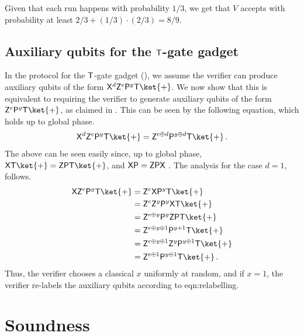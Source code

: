 \documentclass{toc}
\newcommand{\pgate}{{\sf P}}
\newcommand{\rgate}{{\sf T}}
\newcommand{\tgate}{{\sf T}}
\newcommand{\xgate}{{\sf X}}
\newcommand{\zgate}{{\sf Z}}
\begin{document}
Given that each run happens with probability ${1}/{3}$, we get that $V$ accepts with probability at least ${2}/{3} + ({1}/{3}) \cdot ({2}/{3}) = {8}/{9}$.

\subsection{Auxiliary qubits for the \texorpdfstring{$\tgate$}{T}-gate gadget}
\label{section:resources-T-gate}
In the protocol for the $\tgate$-gate gadget (), we assume the verifier can produce auxiliary qubits of the form $\xgate^d\zgate^e\pgate^y\tgate\ket{+}$. We now show that this is equivalent to requiring the verifier to generate auxiliary qubits of the form $\zgate^e \pgate^y \tgate \ket{+}$, as claimed in .
%
%
This can be seen by the following equation, which holds up to global phase. 
\begin{equation}
\label{eqn:relabelling}
\xgate^d\zgate^e \pgate^y \tgate \ket{+} = \zgate^{e  \oplus d} \pgate^{y \oplus d} \tgate \ket{+}\,.
\end{equation}
The above can be seen easily since, up to global phase, $\xgate \rgate \ket{+} = \zgate \pgate \rgate \ket{+} $, and $\xgate \pgate = \zgate \pgate \xgate$%
.
%
%
The analysis for the case $d=1$, follows. 
\begin{align}
\xgate\zgate^e \pgate^y \tgate \ket{+} &= \zgate^e \xgate  \pgate^y \tgate \ket{+}\\
& = \zgate^e \zgate^y \pgate^y \xgate \tgate \ket{+} \\
&= \zgate^{e\oplus y}  \pgate^y \zgate \pgate  \tgate \ket{+} \\
&= \zgate^{e\oplus y \oplus 1}  \pgate^{y +1} \tgate \ket{+}\\
&=  \zgate^{e\oplus y \oplus 1}  \zgate^y \pgate^{y \oplus 1} \tgate \ket{+}\\
&=  \zgate^{e \oplus 1} \pgate^{y \oplus 1} \tgate \ket{+}\,.
\end{align}
Thus, the verifier chooses a classical $x$ uniformly at random, and if $x=1$, the verifier re-labels the auxiliary qubits according to  {eqn:relabelling}.

\section{Soundness}
\label{sec:soundness}
\end{document}
